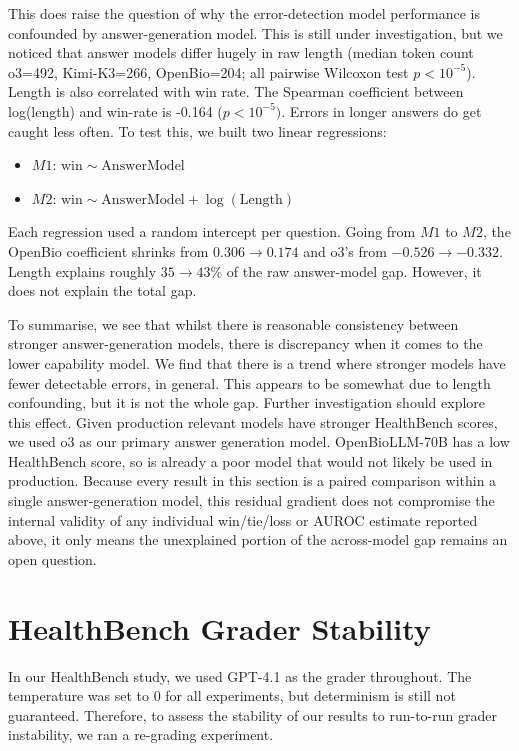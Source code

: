 \documentclass{article}
\newcommand{\appendixsection}[1]{%
  \section{#1}%
  \addcontentsline{apc}{section}{\protect\numberline{\thesection}#1}%
}
\begin{document}
This does raise the question of why the error-detection model performance is confounded by answer-generation model. This is still under investigation, but we noticed that answer models differ hugely in raw length (median token count o3=492, Kimi-K3=266, OpenBio=204; all pairwise Wilcoxon test $p < 10^{-5}$). Length is also correlated with win rate. The Spearman coefficient between log(length) and win-rate is -0.164 ($p < 10^{-5})$. Errors in longer answers do get caught less often. To test this, we built two linear regressions:
\begin{itemize}
    \item $M1$: $\mathrm{win} \sim \mathrm{AnswerModel}$
    \item $M2$: $\mathrm{win} \sim \mathrm{AnswerModel} + \log(\mathrm{Length})$
\end{itemize}
Each regression used a random intercept per question. Going from $M1$ to $M2$, the OpenBio coefficient shrinks from $0.306 \rightarrow 0.174$ and o3's from $-0.526 \rightarrow -0.332$. Length explains roughly $35\rightarrow43\%$ of the raw answer-model gap. However, it does not explain the total gap. 

To summarise, we see that whilst there is reasonable consistency between stronger answer-generation models, there is discrepancy when it comes to the lower capability model. We find that there is a trend where stronger models have fewer detectable errors, in general. This appears to be somewhat due to length confounding, but it is not the whole gap. Further investigation should explore this effect. Given production relevant models have stronger HealthBench scores, we used o3 as our primary answer generation model. OpenBioLLM-70B has a low HealthBench score, so is already a poor model that would not likely be used in production. Because every result in this section is a paired comparison within a single answer-generation model, this residual gradient does not compromise the internal validity of any individual win/tie/loss or AUROC estimate reported above, it only means the unexplained portion of the across-model gap remains an open question.


\newpage
\onecolumn 
\appendixsection{HealthBench Grader Stability}
\label{appendix:grader-stability}

In our HealthBench study, we used GPT-4.1 as the grader throughout. The temperature was set to 0 for all experiments, but determinism is still not guaranteed. Therefore, to assess the stability of our results to run-to-run grader instability, we ran a re-grading experiment. 
\end{document}
